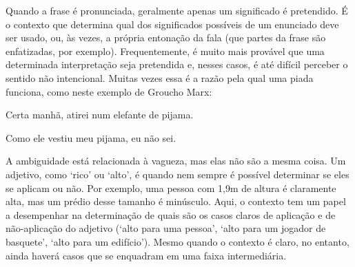 Quando a frase é pronunciada, geralmente apenas um significado é pretendido. É o contexto que determina qual dos significados possíveis de um enunciado deve ser usado, ou, às vezes, a própria entonação da fala (que partes da frase são enfatizadas, por exemplo). Frequentemente, é muito mais provável que uma determinada interpretação seja pretendida e, nesses casos, é até difícil perceber o sentido não intencional. Muitas vezes essa é a razão pela qual uma piada funciona, como neste exemplo de Groucho Marx:
\begin{earg}
\item[] Certa manhã, atirei num elefante de pijama.
\item[] Como ele vestiu meu pijama, eu não sei.
\end{earg} 

A ambiguidade está relacionada à vagueza, mas elas não são a mesma coisa. Um adjetivo, como `rico' ou `alto', é  quando nem sempre é possível determinar se eles se aplicam ou não. Por exemplo, uma pessoa com 1,9m de altura é claramente alta, mas um prédio desse tamanho é minúsculo. Aqui, o contexto tem um papel a desempenhar na determinação de quais são os casos claros de aplicação e de não-aplicação do adjetivo (`alto para uma pessoa', `alto para um jogador de basquete', `alto para um edifício'). Mesmo quando o contexto é claro, no entanto, ainda haverá casos que se enquadram em uma faixa intermediária.

